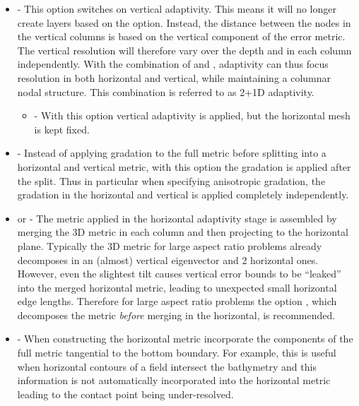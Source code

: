 \begin{itemize}
\item {} -
This option switches on vertical adaptivity. This means it will no longer create
layers based on the  option. Instead, the distance
between the nodes in the vertical columns is based on the vertical component of
the error metric. The vertical resolution will therefore vary over the depth and 
in each column independently. With the combination of
 and
, adaptivity can thus focus resolution
in both horizontal and vertical, while maintaining a columnar nodal structure.
This combination is referred to as 2+1D adaptivity.
\begin{itemize}
\item {} - With this option vertical adaptivity is
applied, but the horizontal mesh is kept fixed.
\end{itemize}
\item {} - Instead of applying gradation to the full metric
before splitting into a horizontal and vertical metric, with this option the
gradation is applied after the split. Thus in particular when specifying
anisotropic gradation, the gradation in the horizontal and vertical is applied
completely independently.
\item {} or  -
The metric applied in the horizontal adaptivity stage is assembled by merging
the 3D metric in each column and then projecting to the horizontal plane. 
Typically the 3D metric for large aspect ratio problems already decomposes 
in an (almost) vertical eigenvector and 2 horizontal ones. 
However, even the slightest tilt causes vertical error bounds 
to be ``leaked'' into the merged horizontal metric, leading to unexpected small
horizontal edge lengths. Therefore for large aspect ratio problems the option
, which decomposes the metric \emph{before}
merging in the horizontal, is recommended.
\item {} - When constructing the horizontal metric
incorporate the components of the full metric tangential to the bottom boundary.
For example, this is useful when horizontal contours of a field intersect the
bathymetry and this information is not automatically incorporated into the
horizontal metric leading to the contact point being under-resolved.
\end{itemize}

